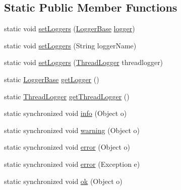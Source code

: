 \subsection*{Static Public Member Functions}
\begin{DoxyCompactItemize}
\item 
static void \hyperlink{classit_1_1emarolab_1_1cagg_1_1debugging_1_1UILog_a38ec36bce88fcf853eac21655dd6d6f1}{set\-Loggers} (\hyperlink{classit_1_1emarolab_1_1cagg_1_1debugging_1_1DebuggingText_1_1LoggerBase}{Logger\-Base} \hyperlink{classit_1_1emarolab_1_1cagg_1_1debugging_1_1UILog_a2c69fb044fed2a1bda3aa625f070799a}{logger})
\item 
static void \hyperlink{classit_1_1emarolab_1_1cagg_1_1debugging_1_1UILog_a595f20d2eadc12be2326935a4c79384c}{set\-Loggers} (String logger\-Name)
\item 
static void \hyperlink{classit_1_1emarolab_1_1cagg_1_1debugging_1_1UILog_ab167e342e262ed93da6fe58d7f161da0}{set\-Loggers} (\hyperlink{classit_1_1emarolab_1_1cagg_1_1core_1_1evaluation_1_1CaggThread_1_1ThreadLogger}{Thread\-Logger} threadlogger)
\item 
static \hyperlink{classit_1_1emarolab_1_1cagg_1_1debugging_1_1DebuggingText_1_1LoggerBase}{Logger\-Base} \hyperlink{classit_1_1emarolab_1_1cagg_1_1debugging_1_1UILog_a188db845b9d2e4459aa4ca8e119d27f4}{get\-Logger} ()
\item 
static \hyperlink{classit_1_1emarolab_1_1cagg_1_1core_1_1evaluation_1_1CaggThread_1_1ThreadLogger}{Thread\-Logger} \hyperlink{classit_1_1emarolab_1_1cagg_1_1debugging_1_1UILog_a88aa255525c8b7eca340bc2ade9b1648}{get\-Thread\-Logger} ()
\item 
static synchronized void \hyperlink{classit_1_1emarolab_1_1cagg_1_1debugging_1_1UILog_a1b28be4ea8d87cdd3dae01062b951f73}{info} (Object o)
\item 
static synchronized void \hyperlink{classit_1_1emarolab_1_1cagg_1_1debugging_1_1UILog_a26792c916fc00f512cf9893af93a2e52}{warning} (Object o)
\item 
static synchronized void \hyperlink{classit_1_1emarolab_1_1cagg_1_1debugging_1_1UILog_acc224377247a98bc8c3e2bde106548d0}{error} (Object o)
\item 
static synchronized void \hyperlink{classit_1_1emarolab_1_1cagg_1_1debugging_1_1UILog_a0dbcf8b44510fd6cf39d6b9c9be58dfc}{error} (Exception e)
\item 
static synchronized void \hyperlink{classit_1_1emarolab_1_1cagg_1_1debugging_1_1UILog_a20a063b07b1449df74bd4392c1f8f83b}{ok} (Object o)
\end{DoxyCompactItemize}
